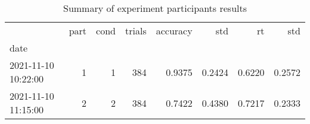 \begin{table}
\centering
\caption{Summary of experiment participants results}
\label{table-subject-summary}
\begin{tabular}{lrrrrrrr}
\toprule
{} & part & cond & trials & accuracy &    std &     rt &    std \\
date                &      &      &        &          &        &        &        \\
\midrule
2021-11-10 10:22:00 &    1 &    1 &    384 &   0.9375 & 0.2424 & 0.6220 & 0.2572 \\
2021-11-10 11:15:00 &    2 &    2 &    384 &   0.7422 & 0.4380 & 0.7217 & 0.2333 \\
\bottomrule
\end{tabular}
\end{table}

